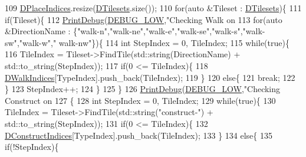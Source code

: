 \begin{DoxyCode}
109     \hyperlink{classCAssetRenderer_a5d20fe39b33a35847b7332b46cfbf3c6}{DPlaceIndices}.resize(\hyperlink{classCAssetRenderer_ae8201de704851c1de6424a8da77b785e}{DTilesets}.size());
110     \textcolor{keywordflow}{for}(\textcolor{keyword}{auto} &Tileset : \hyperlink{classCAssetRenderer_ae8201de704851c1de6424a8da77b785e}{DTilesets})\{
111         \textcolor{keywordflow}{if}(Tileset)\{
112             \hyperlink{Debug_8h_aa5f00f5537c9760f6ae1782460748ab9}{PrintDebug}(\hyperlink{Debug_8h_a3a5f3fc09784650d8388cb854882f840}{DEBUG\_LOW},\textcolor{stringliteral}{"Checking Walk on %
113             \textcolor{keywordflow}{for}(\textcolor{keyword}{auto} &DirectionName : \{\textcolor{stringliteral}{"walk-n"},\textcolor{stringliteral}{"walk-ne"},\textcolor{stringliteral}{"walk-e"},\textcolor{stringliteral}{"walk-se"},\textcolor{stringliteral}{"walk-s"},\textcolor{stringliteral}{"walk-sw"},\textcolor{stringliteral}{"walk-w"},\textcolor{stringliteral}{"
      walk-nw"}\})\{
114                 \textcolor{keywordtype}{int} StepIndex = 0, TileIndex;
115                 \textcolor{keywordflow}{while}(\textcolor{keyword}{true})\{
116                     TileIndex = Tileset->FindTile(std::string(DirectionName) + std::to\_string(StepIndex));
117                     \textcolor{keywordflow}{if}(0 <= TileIndex)\{
118                         \hyperlink{classCAssetRenderer_a9975fd583c826c9905ccd080659bd3c5}{DWalkIndices}[TypeIndex].push\_back(TileIndex);
119                     \}
120                     \textcolor{keywordflow}{else}\{
121                         \textcolor{keywordflow}{break};   
122                     \}
123                     StepIndex++;
124                 \}
125             \}
126             \hyperlink{Debug_8h_aa5f00f5537c9760f6ae1782460748ab9}{PrintDebug}(\hyperlink{Debug_8h_a3a5f3fc09784650d8388cb854882f840}{DEBUG\_LOW},\textcolor{stringliteral}{"Checking Construct on %
127             \{
128                 \textcolor{keywordtype}{int} StepIndex = 0, TileIndex;
129                 \textcolor{keywordflow}{while}(\textcolor{keyword}{true})\{
130                     TileIndex = Tileset->FindTile(std::string(\textcolor{stringliteral}{"construct-"}) + std::to\_string(StepIndex));
131                     \textcolor{keywordflow}{if}(0 <= TileIndex)\{
132                         \hyperlink{classCAssetRenderer_a1790a8f6992efbb3fea59dde42a3cacb}{DConstructIndices}[TypeIndex].push\_back(TileIndex);
133                     \}
134                     \textcolor{keywordflow}{else}\{
135                         \textcolor{keywordflow}{if}(!StepIndex)\{
}}
\end{DoxyCode}
